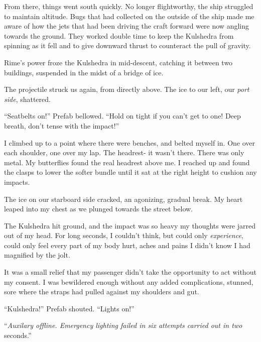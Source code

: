From there, things went south quickly.  No longer flightworthy, the ship struggled to maintain altitude.  Bugs that had collected on the outside of the ship made me aware of how the jets that had been driving the craft forward were now angling towards the ground.  They worked double time to keep the Kulshedra from spinning as it fell and to give downward thrust to counteract the pull of gravity.



Rime's power froze the Kulshedra in mid-descent, catching it between two buildings, suspended in the midst of a bridge of ice.



The projectile struck us again, from directly above.  The ice to our left, our \emph{port side}, shattered.



``Seatbelts on!''  Prefab bellowed.  ``Hold on tight if you can't get to one!  Deep breath, don't tense with the impact!''



I climbed up to a point where there were benches, and belted myself in.  One over each shoulder, one over my lap.  The headrest- it wasn't there.  There was only metal.  My butterflies found the real headrest above me.  I reached up and found the clasps to lower the softer bundle until it sat at the right height to cushion any impacts.



The ice on our starboard side cracked, an agonizing, gradual break.  My heart leaped into my chest as we plunged towards the street below.



The Kulshedra hit ground, and the impact was so heavy my thoughts were jarred out of my head.  For long seconds, I couldn't think, but could only \emph{experience}, could only feel every part of my body hurt, aches and pains I didn't know I had magnified by the jolt.



It was a small relief that my passenger didn't take the opportunity to act without my consent.  I was bewildered enough without any added complications, stunned, sore where the straps had pulled against my shoulders and gut.



``Kulshedra!'' Prefab shouted.  ``Lights on!''



``\emph{Auxilary offline.  Emergency lighting failed in six attempts carried out in two} seconds.''



